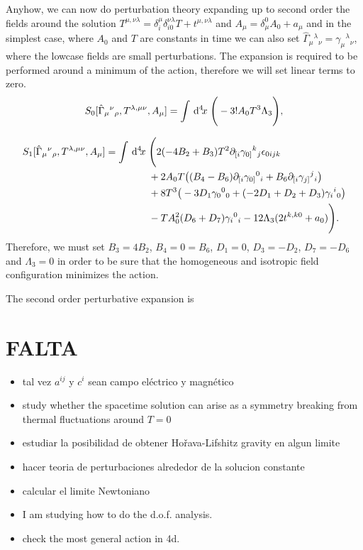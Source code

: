 \documentclass[%
  showpacs,showkeys,prd,superscriptaddress]{revtex4-1}
\begin{document}
Anyhow, we can now do perturbation theory expanding up to second order the fields around the solution $T^{\mu,\nu\lambda} = \delta^{\mu}_i \delta_{i0}^{\nu\lambda}T + t^{\mu,\nu\lambda}$ and $A_\mu=\delta_\mu^0A_0+a_\mu$ and in the simplest case, where $A_0$ and $T$ are constants in time we can also set $\hat{\Gamma}_\mu{}^\lambda{}_\nu=\gamma_\mu{}^\lambda{}_\nu$, where the lowcase fields are small perturbations. The expansion is required to be performed around a minimum of the action, therefore we will set linear terms to zero. 
\begin{equation}
  \label{3+1fullPerturbed}
   S_0[\hat{\Gamma}_{\mu}{}^{\nu}{}_\rho,T^{\lambda,\mu\nu},A_\mu]=\int\,{\mathrm{d}}^{4}\!{x}\;\Bigg(-3!A_0T^3\Lambda_3\Bigg),
\end{equation}

\begin{equation}
  \begin{split}
    \label{3+1full1stOrder}
    S_1[\hat{\Gamma}_{\mu}{}^{\nu}{}_\rho,T^{\lambda,\mu\nu},A_\mu] = \int\,{\mathrm{d}}^{4}\!{x}\; &\Bigg(2(-4B_2+B_3)T^2\partial_{[i}\gamma_{0]}{}^k{}_j\epsilon_{0ijk} \\
    & + 2 A_0 T \big((B_4-B_6)\partial_{[i}\gamma_{0]}{}^0{}_i+B_6\partial_{[i}\gamma_{j]}{}^j{}_i\big)\\
    & + 8 T^3 \big(-3D_1\gamma_0{}^0{}_0+(-2D_1+D_2+D_3)\gamma_i{}^i{}_0\big)\\
    & - T A_0^2(D_6+D_7)\gamma_i{}^0{}_i -12\Lambda_3( 2t^{k,k0}+a_0)\Bigg).
  \end{split}
\end{equation}
Therefore, we must set $B_3=4B_2$, $B_4=0=B_6$, $D_1=0$, $D_3=-D_2$,  $D_7=-D_6$ and $\Lambda_3=0$ in order to be sure that the homogeneous and isotropic field configuration minimizes the action. 

The second order perturbative expansion  is

\section*{FALTA}

\begin{itemize}
\item tal vez $a^{ij}$ y $c^i$ sean campo el\'ectrico y magn\'etico

\item study  whether the spacetime solution can arise as a symmetry breaking from thermal fluctuations around $T=0$

\item estudiar la posibilidad de obtener Ho\v{r}ava-Lifshitz gravity en algun limite

\item hacer teoria de perturbaciones alrededor de la solucion constante

\item calcular el limite Newtoniano

\item I am studying how to do the d.o.f. analysis.
\item check the most general action in 4d.
\end{itemize}

\nocite{Tucker:1996sx,Horava:2009uw,Lu:2009em,Gibbs:1995gj,WheelerPre,Peeters:2007wn,peeters2007symbolic,Peeters2007550,sage}



\end{document}
